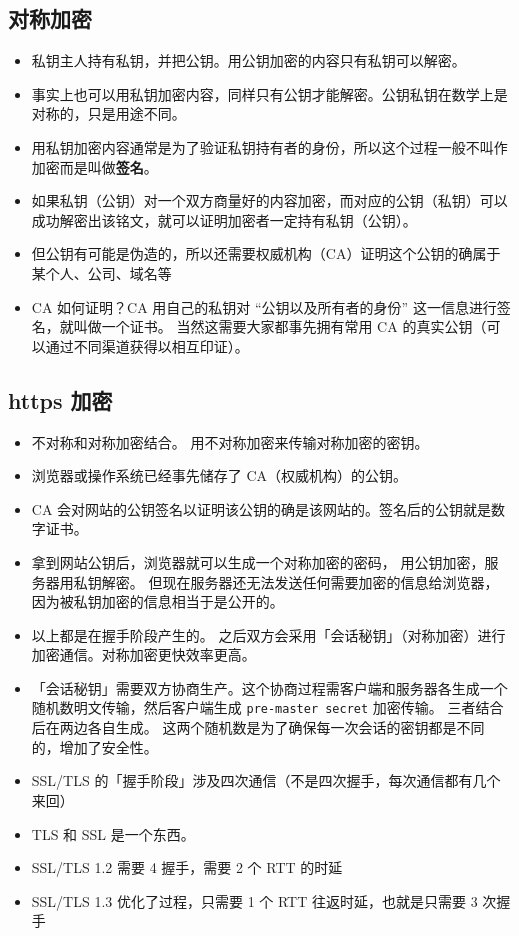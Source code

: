 
\subsection{对称加密}
\begin{itemize}
\item 私钥主人持有私钥，并把公钥。用公钥加密的内容只有私钥可以解密。
\item 事实上也可以用私钥加密内容，同样只有公钥才能解密。公钥私钥在数学上是对称的，只是用途不同。
\item 用私钥加密内容通常是为了验证私钥持有者的身份，所以这个过程一般不叫作加密而是叫做\textbf{签名}。
\item 如果私钥（公钥）对一个双方商量好的内容加密，而对应的公钥（私钥）可以成功解密出该铭文，就可以证明加密者一定持有私钥（公钥）。
\item 但公钥有可能是伪造的，所以还需要权威机构（CA）证明这个公钥的确属于某个人、公司、域名等
\item CA 如何证明？CA 用自己的私钥对 “公钥以及所有者的身份” 这一信息进行签名，就叫做一个证书。 当然这需要大家都事先拥有常用 CA 的真实公钥（可以通过不同渠道获得以相互印证）。
\end{itemize}

\subsection{https 加密}
\begin{itemize}
\item 不对称和对称加密结合。 用不对称加密来传输对称加密的密钥。
\item 浏览器或操作系统已经事先储存了 CA（权威机构）的公钥。
\item CA 会对网站的公钥签名以证明该公钥的确是该网站的。签名后的公钥就是数字证书。
\item 拿到网站公钥后，浏览器就可以生成一个对称加密的密码， 用公钥加密，服务器用私钥解密。 但现在服务器还无法发送任何需要加密的信息给浏览器，因为被私钥加密的信息相当于是公开的。
\item 以上都是在握手阶段产生的。 之后双方会采用「会话秘钥」（对称加密）进行加密通信。对称加密更快效率更高。
\item 「会话秘钥」需要双方协商生产。这个协商过程需客户端和服务器各生成一个随机数明文传输，然后客户端生成 \verb`pre-master secret` 加密传输。 三者结合后在两边各自生成。 这两个随机数是为了确保每一次会话的密钥都是不同的，增加了安全性。
\item SSL/TLS 的「握手阶段」涉及四次通信（不是四次握手，每次通信都有几个来回）
\item TLS 和 SSL 是一个东西。
\item SSL/TLS 1.2 需要 4 握手，需要 2 个 RTT 的时延
\item SSL/TLS 1.3 优化了过程，只需要 1 个 RTT 往返时延，也就是只需要 3 次握手
\end{itemize}
